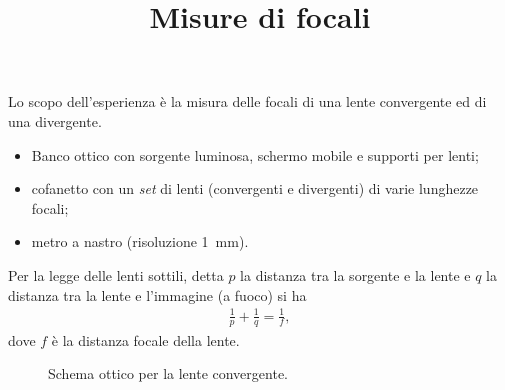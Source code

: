 \documentclass{lab1-article}
\title{Misure di focali}
\begin{document}
\begin{article}

\maketitle

\secsummary

Lo scopo dell'esperienza \`e la misura delle focali di una lente convergente
ed di una divergente.


\secmaterials

\begin{itemize}
\item Banco ottico con sorgente luminosa, schermo mobile e supporti per lenti;
\item cofanetto con un \emph{set} di lenti (convergenti e divergenti) di
  varie lunghezze focali;
\item metro a nastro (risoluzione 1~mm).
\end{itemize}


\secmeasurements

Per la legge delle lenti sottili, detta $p$ la distanza tra la sorgente e la
lente e $q$ la distanza tra la lente e l'immagine (a fuoco) si ha
\begin{align}
  \frac{1}{p} + \frac{1}{q} = \frac{1}{f},
\end{align}
dove $f$ \`e la distanza focale della lente.



\begin{figure}[htb!]
\begin{center}
  \caption{Schema ottico per la lente convergente.}
  \label{fig:convergente}
\end{center}
\end{figure}


\end{article}
\end{document}
